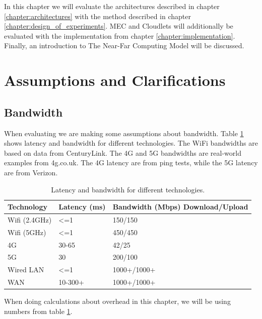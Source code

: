 In this chapter we will evaluate the architectures described in chapter \ref{chapter:architectures} with the method described in chapter \ref{chapter:design_of_experiments}. MEC and Cloudlets will additionally be evaluated with the implementation from chapter \ref{chapter:implementation}. Finally, an introduction to The Near-Far Computing Model will be discussed.






\section{Assumptions and Clarifications}
\subsection{Bandwidth}
When evaluating we are making some assumptions about bandwidth. Table \ref{tab:Bandwidth_latency} shows latency and bandwidth for different technologies. The WiFi bandwidths are based on data from CenturyLink\cite{noauthor_24_nodate}. The 4G and 5G bandwidths are real-world examples from 4g.co.uk\cite{noauthor_how_nodate}. The 4G latency are from ping tests, while the 5G latency are from Verizon\cite{noauthor_what_2020}.
\renewcommand{\arraystretch}{1.2}
\begin{table}[h!]
    \centering
    \begin{tabular}[c]{l|p{3cm}p{4cm}}

        Technology & Latency (ms) & Bandwidth (Mbps) Download/Upload \\
        \hline

        Wifi (2.4GHz) & <=1 & 150/150  \\

        Wifi (5GHz) & <=1 & 450/450  \\

        4G & 30-65 & 42/25  \\

        5G & 30 & 200/100  \\

        Wired LAN & <=1 & 1000+/1000+  \\

        WAN & 10-300+ & 1000+/1000+  \\

        
        
    \end{tabular}
    \caption{Latency and bandwidth for different technologies.}
    \label{tab:Bandwidth_latency}
\end{table}
When doing calculations about overhead in this chapter, we will be using numbers from table \ref{tab:Bandwidth_latency}.





